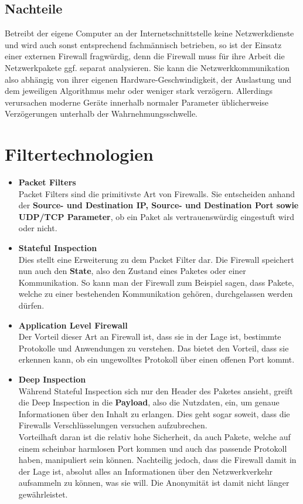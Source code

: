 \subsection{Nachteile}
Betreibt der eigene Computer an der Internetschnittstelle keine Netzwerkdienste und wird auch sonst entsprechend fachmännisch betrieben, so ist der Einsatz einer externen Firewall fragwürdig, denn die Firewall muss für ihre Arbeit die Netzwerkpakete ggf. separat analysieren. Sie kann die Netzwerkkommunikation also abhängig von ihrer eigenen Hardware-Geschwindigkeit, der Auslastung und dem jeweiligen Algorithmus mehr oder weniger stark verzögern. Allerdings verursachen moderne Geräte innerhalb normaler Parameter üblicherweise Verzögerungen unterhalb der Wahrnehmungsschwelle.
\section{Filtertechnologien}
\begin{itemize}
\item \textbf{Packet Filters}\\
Packet Filters sind die primitivste Art von Firewalls. Sie entscheiden anhand der \textbf{Source- und Destination IP, Source- und Destination Port sowie UDP/TCP Parameter}, ob ein Paket als vertrauenswürdig eingestuft wird oder nicht.
\item \textbf{Stateful Inspection}\\
Dies stellt eine Erweiterung zu dem Packet Filter dar. Die Firewall speichert nun auch den \textbf{State}, also den Zustand eines Paketes oder einer Kommunikation. So kann man der Firewall zum Beispiel sagen, dass Pakete, welche zu einer bestehenden Kommunikation gehören, durchgelassen werden dürfen. 
\item \textbf{Application Level Firewall}\\
Der Vorteil dieser Art an Firewall ist, dass sie in der Lage ist, bestimmte Protokolle und Anwendungen zu \glqq verstehen\grqq . Das bietet den Vorteil, dass sie erkennen kann, ob ein ungewolltes Protokoll über einen offenen Port kommt.
\item \textbf{Deep Inspection}\\
Während Stateful Inspection sich nur den Header des Paketes ansieht, greift die Deep Inspection in die \textbf{Payload}, also die Nutzdaten, ein, um genaue Informationen über den Inhalt zu erlangen. Dies geht sogar soweit, dass die Firewalls Verschlüsselungen versuchen aufzubrechen.\\
Vorteilhaft daran ist die relativ hohe Sicherheit, da auch Pakete, welche auf einem scheinbar harmlosen Port kommen und auch das passende Protokoll haben, manipuliert sein können. Nachteilig jedoch, dass die Firewall damit in der Lage ist, absolut alles an Informationen über den Netzwerkverkehr aufsammeln zu können, was sie will. Die Anonymität ist damit nicht länger gewährleistet.
\end{itemize}
